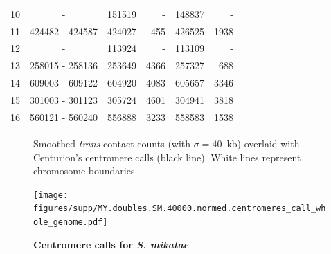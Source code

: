 \begin{table}[ht!]
\begin{center}
\begin{tabular}{c | c  r  r  r  r}
10 & - & \num[group-separator={\,}]{151519} & - & \num[group-separator={\,}]{148837} & - \\
11 & \num[group-separator={\,}]{424482} - \num[group-separator={\,}]{424587} & \num[group-separator={\,}]{424027} & \small{\num[group-separator={\,}]{455}}  & \num[group-separator={\,}]{426525} & \small{\num[group-separator={\,}]{1938}}  \\
12 & - & \num[group-separator={\,}]{113924} & - & \num[group-separator={\,}]{113109} & - \\
13 & \num[group-separator={\,}]{258015} - \num[group-separator={\,}]{258136} & \num[group-separator={\,}]{253649} & \small{\num[group-separator={\,}]{4366}}  & \num[group-separator={\,}]{257327} & \small{\num[group-separator={\,}]{688}}  \\
14 & \num[group-separator={\,}]{609003} - \num[group-separator={\,}]{609122} & \num[group-separator={\,}]{604920} & \small{\num[group-separator={\,}]{4083}}  & \num[group-separator={\,}]{605657} & \small{\num[group-separator={\,}]{3346}}  \\
15 & \num[group-separator={\,}]{301003} - \num[group-separator={\,}]{301123} & \num[group-separator={\,}]{305724} & \small{\num[group-separator={\,}]{4601}}  & \num[group-separator={\,}]{304941} & \small{\num[group-separator={\,}]{3818}}  \\
16 & \num[group-separator={\,}]{560121} - \num[group-separator={\,}]{560240} & \num[group-separator={\,}]{556888} & \small{\num[group-separator={\,}]{3233}}  & \num[group-separator={\,}]{558583} & \small{\num[group-separator={\,}]{1538}}  \\
\end{tabular}
\end{center}
\end{table}


\clearpage

\begin{figure}[ht!]
\caption{\textbf{Centromere calls for \textit{S. mikatae}}}
{Smoothed \textit{trans} contact counts (with $\sigma=40$~kb) overlaid with
Centurion's centromere calls (black line). White lines represent chromosome
boundaries.
}
\begin{center}
\texttt{[image: figures/supp/MY.doubles.SM.40000.normed.centromeres\_call\_whole\_genome.pdf]}
\end{center}
\label{suppfig:SM_calls}
\end{figure}


